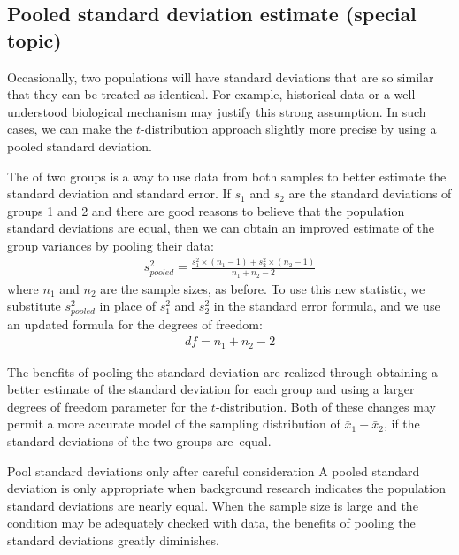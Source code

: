 {\subsection{Pooled standard deviation estimate (special topic)}
\label{pooledStandardDeviations}

Occasionally, two populations will have standard deviations that are so similar that they can be treated as identical. For example, historical data or a well-understood biological mechanism may justify this strong assumption. In such cases, we can make the $t$-distribution approach slightly more precise by using a pooled standard deviation.

The  of two groups is a way to use data from both samples to better estimate the standard deviation and standard error. If $s_1^{}$ and $s_2^{}$ are the standard deviations of groups 1 and 2 and there are good reasons to believe that the population standard deviations are equal, then we can obtain an improved estimate of the group variances by pooling their data:
\begin{align*}
s_{pooled}^2 = \frac{s_1^2\times (n_1-1) + s_2^2\times (n_2-1)}{n_1 + n_2 - 2}
\end{align*}
where $n_1$ and $n_2$ are the sample sizes, as before. To use this new statistic, we substitute $s_{pooled}^2$ in place of $s_1^2$ and $s_2^2$ in the standard error formula, and we use an updated formula for the degrees of freedom:
\begin{align*}
df = n_1 + n_2 - 2
\end{align*}

The benefits of pooling the standard deviation are realized through obtaining a better estimate of the standard deviation for each group and using a larger degrees of freedom parameter for the $t$-distribution. Both of these changes may permit a more accurate model of the sampling distribution of $\bar{x}_1 - \bar{x}_2$, if the standard deviations of the two groups are~equal.

\begin{caution}
{Pool standard deviations only after careful consideration}
{A pooled standard deviation is only appropriate when background research indicates the population standard deviations are nearly equal. When the sample size is large and the condition may be adequately checked with data, the benefits of pooling the standard deviations greatly diminishes.}
\end{caution}
}


